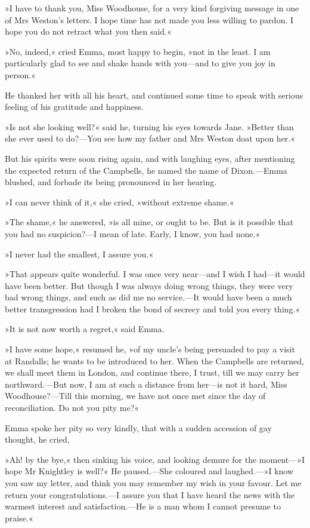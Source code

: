 »I have to thank you, Miss Woodhouse, for a very kind forgiving message in one of Mrs Weston's letters. I hope time has not made you less willing to pardon. I hope you do not retract what you then said.«

»No, indeed,« cried Emma, most happy to begin, »not in the least. I am particularly glad to see and shake hands with you—and to give you joy in person.«

He thanked her with all his heart, and continued some time to speak with serious feeling of his gratitude and happiness.

»Is not she looking well?« said he, turning his eyes towards Jane. »Better than she ever used to do?—You see how my father and Mrs Weston doat upon her.«

But his spirits were soon rising again, and with laughing eyes, after mentioning the expected return of the Campbells, he named the name of Dixon.—Emma blushed, and forbade its being pronounced in her hearing.

»I can never think of it,« she cried, »without extreme shame.«

»The shame,« he answered, »is all mine, or ought to be. But is it possible that you had no suspicion?—I mean of late. Early, I know, you had none.«

»I never had the smallest, I assure you.«

»That appears quite wonderful. I was once very near—and I wish I had—it would have been better. But though I was always doing wrong things, they were very bad wrong things, and such as did me no service.—It would have been a much better transgression had I broken the bond of secrecy and told you every thing.«

»It is not now worth a regret,« said Emma.

»I have some hope,« resumed he, »of my uncle's being persuaded to pay a visit at Randalls; he wants to be introduced to her. When the Campbells are returned, we shall meet them in London, and continue there, I trust, till we may carry her northward.—But now, I am at such a distance from her—is not it hard, Miss Woodhouse?—Till this morning, we have not once met since the day of reconciliation. Do not you pity me?«

Emma spoke her pity so very kindly, that with a sudden accession of gay thought, he cried,

»Ah! by the bye,« then sinking his voice, and looking demure for the moment—»I hope Mr Knightley is well?« He paused.—She coloured and laughed.—»I know you saw my letter, and think you may remember my wish in your favour. Let me return your congratulations.—I assure you that I have heard the news with the warmest interest and satisfaction.—He is a man whom I cannot presume to praise.«

